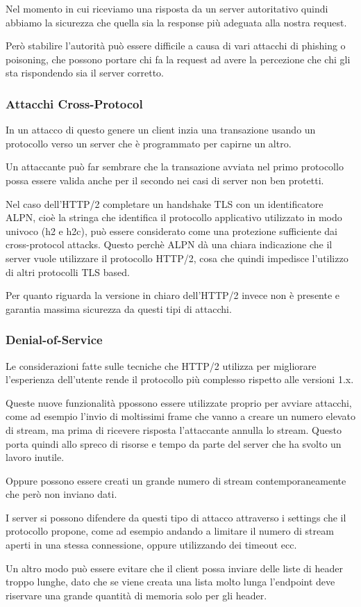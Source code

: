 \documentclass[12pt, a4paper]{article} %
\begin{document}
Nel momento in cui riceviamo una risposta da un server autoritativo quindi abbiamo la sicurezza che quella sia la response più adeguata alla nostra request.

Però stabilire l'autorità può essere difficile a causa di vari attacchi di phishing o poisoning, che possono portare chi fa la request ad avere la percezione che chi gli sta rispondendo sia il server corretto.

\subsubsection{Attacchi Cross-Protocol}
In un attacco di questo genere un client inzia una transazione usando un protocollo verso un server che è programmato per capirne un altro.

Un attaccante può far sembrare che la transazione avviata nel primo protocollo possa essere valida anche per il secondo nei casi di server non ben protetti.

Nel caso dell'HTTP/2 completare un handshake TLS con un identificatore ALPN, cioè la stringa che identifica il protocollo applicativo utilizzato in modo univoco (h2 e h2c), può essere considerato come una protezione sufficiente dai cross-protocol attacks.
Questo perchè ALPN dà una chiara indicazione che il server vuole utilizzare il protocollo HTTP/2, cosa che quindi impedisce l'utilizzo di altri protocolli TLS based.

Per quanto riguarda la versione in chiaro dell'HTTP/2 invece non è presente e garantia massima sicurezza da questi tipi di attacchi.

\subsubsection{Denial-of-Service}
Le considerazioni fatte sulle tecniche che HTTP/2 utilizza per migliorare l'esperienza dell'utente rende il protocollo più complesso rispetto alle versioni 1.x.

Queste nuove funzionalità ppossono essere utilizzate proprio per avviare attacchi, come ad esempio l'invio di moltissimi frame che vanno a creare un numero elevato di stream, ma prima di ricevere risposta l'attaccante annulla lo stream.
Questo porta quindi allo spreco di risorse e tempo da parte del server che ha svolto un lavoro inutile.

Oppure possono essere creati un grande numero di stream contemporaneamente che però non inviano dati.

I server si possono difendere da questi tipo di attacco attraverso i settings che il protocollo propone, come ad esempio andando a limitare il numero di stream aperti in una stessa connessione, oppure utilizzando dei timeout ecc.

Un altro modo può essere evitare che il client possa inviare delle liste di header troppo lunghe, dato che se viene creata una lista molto lunga l'endpoint deve riservare una grande quantità di memoria solo per gli header.
\end{document}
